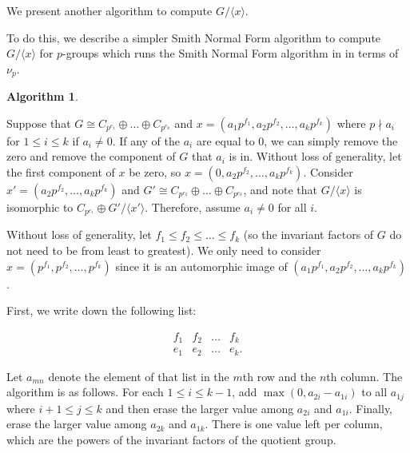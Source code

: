 \documentclass[11pt]{amsart}
\theoremstyle{definition}
\newtheorem{alg}[lem]{Algorithm}
\newcommand{\setx}{\langle x \rangle}
\renewcommand{\leq}{\leqslant}
\numberwithin{equation}{section}
\begin{document}
We present another algorithm to compute $G/\setx$. 

To do this, we describe a simpler Smith Normal Form algorithm to compute $G/\langle x \rangle$ for $p$-groups which runs the Smith Normal Form algorithm in \cite{artin} in terms of $\nu_p$. 

\begin{alg}\label{psmith}

Suppose that $G \cong C_{p^{e_1}} \oplus \dots \oplus C_{p^{e_k}}$ and $x = (a_1p^{f_1}, a_2p^{f_2}, \dots, a_kp^{f_k})$ where $p \nmid a_i$ for $1 \leq i 
\leq k$ if $a_i \neq 0$. If any of the $a_i$ are equal to $0$, we can simply remove the zero and remove the component of $G$ that $a_i$ is in. Without loss of generality, let the first component of $x$ be zero, so $x = (0, a_2p^{f_2}, \dots, a_kp^{f_k})$. Consider $x' = (a_2p^{f_2}, \dots, a_kp^{f_k})$ and $G' \cong  C_{p^{e_2}} \oplus \dots \oplus C_{p^{e_k}}$, and note that $G/\langle x \rangle$ is isomorphic to $C_{p^{e_1}} \oplus G'/\langle x' \rangle$. Therefore, assume $a_i \neq 0$ for all $i$.

Without loss of generality, let $f_1 \leq f_2 \leq \dots \leq f_k$ (so the invariant factors of $G$ do not need to be from least to greatest). We only need to consider $x = (p^{f_1}, p^{f_2}, \dots, p^{f_k})$ since it is an automorphic image of $(a_1p^{f_1}, a_2p^{f_2}, \dots, a_kp^{f_k})$. 

First, we write down the following list:

\[\displaystyle \begin{matrix}
f_{1} & f_{2} & \dotsc  & f_{k}\\
e_{1} & e_{2} & \dotsc  & e_{k}. 
\end{matrix}\]

Let $a_{mn}$ denote the element of that list in the $m$th row and the $n$th column. The algorithm is as follows. For each $1 \leq i \leq k-1$, add $\max(0, a_{2i} - a_{1i})$ to all $a_{1j}$ where $i + 1 \leq j \leq k$ and then erase the larger value among $a_{2i}$ and $a_{1i}$. Finally, erase the larger value among $a_{2k}$ and $a_{1k}$. There is one value left per column, which are the powers of the invariant factors of the quotient group. 
\end{alg}
\end{document}
